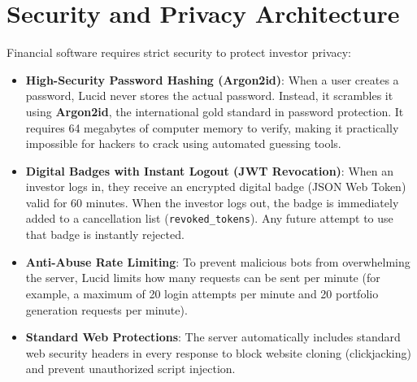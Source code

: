 \section{Security and Privacy Architecture}
Financial software requires strict security to protect investor privacy:
\begin{itemize}
    \item \textbf{High-Security Password Hashing (Argon2id)}: When a user creates a password, Lucid never stores the actual password. Instead, it scrambles it using \textbf{Argon2id}, the international gold standard in password protection. It requires 64 megabytes of computer memory to verify, making it practically impossible for hackers to crack using automated guessing tools.
    \item \textbf{Digital Badges with Instant Logout (JWT Revocation)}: When an investor logs in, they receive an encrypted digital badge (JSON Web Token) valid for 60 minutes. When the investor logs out, the badge is immediately added to a cancellation list (\texttt{revoked\_tokens}). Any future attempt to use that badge is instantly rejected.
    \item \textbf{Anti-Abuse Rate Limiting}: To prevent malicious bots from overwhelming the server, Lucid limits how many requests can be sent per minute (for example, a maximum of 20 login attempts per minute and 20 portfolio generation requests per minute).
    \item \textbf{Standard Web Protections}: The server automatically includes standard web security headers in every response to block website cloning (clickjacking) and prevent unauthorized script injection.
\end{itemize}
